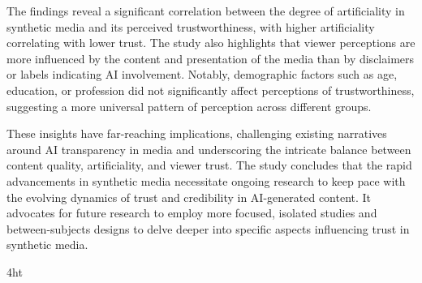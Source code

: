 \documentclass[
  a4paper,  %
  twoside,  %
  bibliography=totoc,
  headsepline,
  cleardoublepage=empty,
  parskip=half,
  draft=false
]{scrbook}
\begin{document}
The findings reveal a significant correlation between the degree of artificiality in synthetic media and its perceived trustworthiness, with higher artificiality correlating with lower trust. The study also highlights that viewer perceptions are more influenced by the content and presentation of the media than by disclaimers or labels indicating AI involvement. Notably, demographic factors such as age, education, or profession did not significantly affect perceptions of trustworthiness, suggesting a more universal pattern of perception across different groups.

These insights have far-reaching implications, challenging existing narratives around AI transparency in media and underscoring the intricate balance between content quality, artificiality, and viewer trust. The study concludes that the rapid advancements in synthetic media necessitate ongoing research to keep pace with the evolving dynamics of trust and credibility in AI-generated content. It advocates for future research to employ more focused, isolated studies and between-subjects designs to delve deeper into specific aspects influencing trust in synthetic media.

\cleardoublepage



\iftex4ht
\else
\fi

%
%

%
%
%
\tableofcontents


\listoffigures
\listoftables


\let\iflistings\iffalse
\iflistings
  \ifdeutsch
  \else
  \fi
\fi
\end{document}
